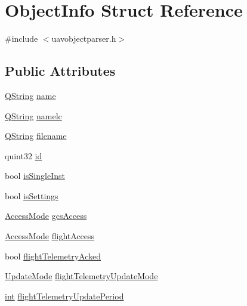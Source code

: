 \hypertarget{struct_object_info}{\section{Object\-Info Struct Reference}
\label{struct_object_info}
}


{\ttfamily \#include $<$uavobjectparser.\-h$>$}

\subsection*{Public Attributes}
\begin{DoxyCompactItemize}
\item 
\hyperlink{group___u_a_v_objects_plugin_gab9d252f49c333c94a72f97ce3105a32d}{Q\-String} \hyperlink{struct_object_info_aae920cf301d814ac2025a0c03ee1aed9}{name}
\item 
\hyperlink{group___u_a_v_objects_plugin_gab9d252f49c333c94a72f97ce3105a32d}{Q\-String} \hyperlink{struct_object_info_ad963c87ba31990cb3c21da5dbab6541d}{namelc}
\item 
\hyperlink{group___u_a_v_objects_plugin_gab9d252f49c333c94a72f97ce3105a32d}{Q\-String} \hyperlink{struct_object_info_a12f0ba613130fe1bad580d7a40ae05d7}{filename}
\item 
quint32 \hyperlink{struct_object_info_aa7808d8103bc4df38ccf7d14d5d9e379}{id}
\item 
bool \hyperlink{struct_object_info_a6e98a9ae0a0093b9312732489be70349}{is\-Single\-Inst}
\item 
bool \hyperlink{struct_object_info_a8a4b9d3a602cd467a21b4dfe2b9a7fa0}{is\-Settings}
\item 
\hyperlink{uavobjectparser_8h_ab22d35ed086a478dd91e93ac78037f40}{Access\-Mode} \hyperlink{struct_object_info_a6c262011c1c6ac81a11c042c34dcd4ec}{gcs\-Access}
\item 
\hyperlink{uavobjectparser_8h_ab22d35ed086a478dd91e93ac78037f40}{Access\-Mode} \hyperlink{struct_object_info_a2cad788f09c3a692fe7c12dcaaadd4e5}{flight\-Access}
\item 
bool \hyperlink{struct_object_info_a8eb921a735b0e225232754c57b4be129}{flight\-Telemetry\-Acked}
\item 
\hyperlink{uavobjectparser_8h_af6f79ca652f5cd37cb76957fb76b1630}{Update\-Mode} \hyperlink{struct_object_info_ac0c493bc75ddcfa7a016cae168641caf}{flight\-Telemetry\-Update\-Mode}
\item 
\hyperlink{ioapi_8h_a787fa3cf048117ba7123753c1e74fcd6}{int} \hyperlink{struct_object_info_a659d50fa67292fdf892813c1b872cf0c}{flight\-Telemetry\-Update\-Period}

\end{DoxyCompactItemize}
